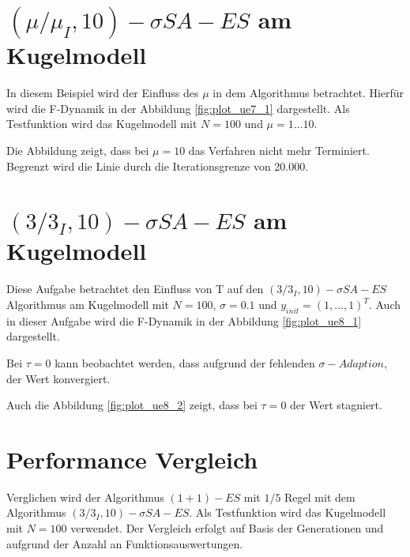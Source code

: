 \setcounter{chapter}{6}

\chapter{$(\mu/\mu_I,10)-\sigma SA-ES$ am Kugelmodell}

In diesem Beispiel wird der Einfluss des $\mu$ in dem Algorithmus betrachtet. Hierfür wird die F-Dynamik in der Abbildung \ref{fig:plot_ue7_1} dargestellt. Als Testfunktion wird das Kugelmodell mit $N=100$ und $\mu=1...10$.


Die Abbildung zeigt, dass bei $\mu=10$ das Verfahren nicht mehr Terminiert. Begrenzt wird die Linie durch die Iterationsgrenze von 20.000.

\chapter{$(3/3_I,10)-\sigma SA-ES$ am Kugelmodell}

Diese Aufgabe betrachtet den Einfluss von T auf den $(3/3_I,10)-\sigma SA-ES$ Algorithmus am Kugelmodell mit $N=100$, $\sigma=0.1$ und $y_{init}=(1,...,1)^T$. Auch in dieser Aufgabe wird die F-Dynamik in der Abbildung \ref{fig:plot_ue8_1} dargestellt.


Bei $\tau=0$ kann beobachtet werden, dass aufgrund der fehlenden $\sigma - Adaption$, der Wert konvergiert.


Auch die Abbildung \ref{fig:plot_ue8_2} zeigt, dass bei $\tau=0$ der Wert stagniert.

\chapter{Performance Vergleich}

Verglichen wird der Algorithmus $(1+1)-ES$ mit $1/5$ Regel mit dem Algorithmus $(3/3_I,10)-\sigma SA-ES$. Als Testfunktion wird das Kugelmodell mit $N=100$ verwendet. Der Vergleich erfolgt auf Basis der Generationen und aufgrund der Anzahl an Funktionsauswertungen.\\

